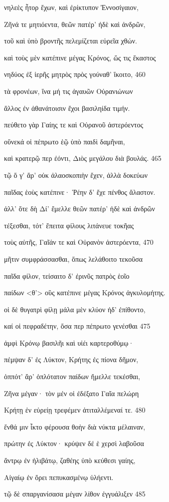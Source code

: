 νηλεὲς ἦτορ ἔχων, καὶ ἐρίκτυπον Ἐννοσίγαιον,

Ζῆνά τε μητιόεντα, θεῶν πατέρ' ἠδὲ καὶ ἀνδρῶν,

τοῦ καὶ ὑπὸ βροντῆς πελεμίζεται εὐρεῖα χθών.

καὶ τοὺς μὲν κατέπινε μέγας Κρόνος, ὥς τις ἕκαστος

νηδύος ἐξ ἱερῆς μητρὸς πρὸς γούναθ' ἵκοιτο, \num{460}

τὰ φρονέων, ἵνα μή τις ἀγαυῶν Οὐρανιώνων

ἄλλος ἐν ἀθανάτοισιν ἔχοι βασιληίδα τιμήν.

πεύθετο γὰρ Γαίης τε καὶ Οὐρανοῦ ἀστερόεντος 

οὕνεκά οἱ πέπρωτο ἑῷ ὑπὸ παιδὶ δαμῆναι, 

καὶ κρατερῷ περ ἐόντι, Διὸς μεγάλου διὰ βουλάς. \num{465} 

τῷ ὅ γ' ἄρ' οὐκ ἀλαοσκοπιὴν ἔχεν, ἀλλὰ δοκεύων 

παῖδας ἑοὺς κατέπινε· Ῥέην δ' ἔχε πένθος ἄλαστον. 

ἀλλ' ὅτε δὴ Δί' ἔμελλε θεῶν πατέρ' ἠδὲ καὶ ἀνδρῶν

τέξεσθαι, τότ' ἔπειτα φίλους λιτάνευε τοκῆας

τοὺς αὐτῆς, Γαῖάν τε καὶ Οὐρανὸν ἀστερόεντα, \num{470}

μῆτιν συμφράσσασθαι, ὅπως λελάθοιτο τεκοῦσα

παῖδα φίλον, τείσαιτο δ' ἐρινῦς πατρὸς ἑοῖο 

παίδων \textless{}θ'\textgreater{} οὓς κατέπινε μέγας Κρόνος
ἀγκυλομήτης. 

οἱ δὲ θυγατρὶ φίλῃ μάλα μὲν κλύον ἠδ' ἐπίθοντο, 

καί οἱ πεφραδέτην, ὅσα περ πέπρωτο γενέσθαι \num{475}

ἀμφὶ Κρόνῳ βασιλῆι καὶ υἱέι καρτεροθύμῳ· 

πέμψαν δ' ἐς Λύκτον, Κρήτης ἐς πίονα δῆμον,

ὁππότ' ἄρ' ὁπλότατον παίδων ἤμελλε τεκέσθαι, 

Ζῆνα μέγαν· τὸν μέν οἱ ἐδέξατο Γαῖα πελώρη 

Κρήτῃ ἐν εὐρείῃ τρεφέμεν ἀτιταλλέμεναί τε. \num{480} 

ἔνθά μιν ἷκτο φέρουσα θοὴν διὰ νύκτα μέλαιναν, 

πρώτην ἐς Λύκτον· κρύψεν δέ ἑ χερσὶ λαβοῦσα 

ἄντρῳ ἐν ἠλιβάτῳ, ζαθέης ὑπὸ κεύθεσι γαίης,

Αἰγαίῳ ἐν ὄρει πεπυκασμένῳ ὑλήεντι.

τῷ δὲ σπαργανίσασα μέγαν λίθον ἐγγυάλιξεν \num{485}

